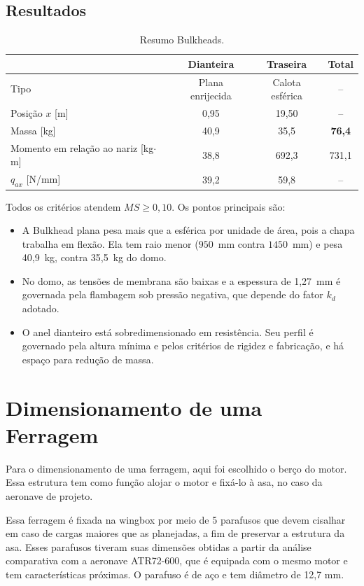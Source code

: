 \subsection{Resultados}

\begin{table}[htbp]
    \centering
    \caption{Resumo Bulkheads.}
    \label{tab:bulk_resumo}
    \begin{tabular}{lccc}
        \toprule
        & Dianteira & Traseira & Total \\
        \midrule
        Tipo & Plana enrijecida & Calota esférica & -- \\
        Posição $x$ [m] & 0,95 & 19,50 & -- \\
        Massa [kg] & 40,9 & 35,5 & \textbf{76,4} \\
        Momento em relação ao nariz [kg$\cdot$m] & 38,8 & 692,3 & 731,1 \\
        $q_{ax}$ [N/mm] & 39,2 & 59,8 & -- \\
        \bottomrule
    \end{tabular}
\end{table}

Todos os critérios atendem $MS \geq 0{,}10$. Os pontos principais são:
\begin{itemize}
    \item A Bulkhead plana pesa mais que a esférica por unidade de área, pois a chapa trabalha em flexão. Ela tem raio menor ($950$~mm contra $1450$~mm) e pesa 40,9~kg, contra 35,5~kg do domo.
    \item No domo, as tensões de membrana são baixas e a espessura de 1,27~mm é governada pela flambagem sob pressão negativa, que depende do fator $k_d$ adotado. 
    \item O anel dianteiro está sobredimensionado em resistência. Seu perfil é governado pela altura mínima e pelos critérios de rigidez e fabricação, e há espaço para redução de massa.
\end{itemize}

\section{Dimensionamento de uma Ferragem}

Para o dimensionamento de uma ferragem, aqui foi escolhido o berço do motor. Essa estrutura tem como função alojar o motor e fixá-lo à asa, no caso da aeronave de projeto. 

Essa ferragem é fixada na wingbox por meio de 5 parafusos que devem cisalhar em caso de cargas maiores que as planejadas, a fim de preservar a estrutura da asa. Esses parafusos tiveram suas dimensões obtidas a partir da análise comparativa com a aeronave ATR72-600, que é equipada com o mesmo motor e tem características próximas. O parafuso é de aço e tem diâmetro de 12,7 mm.

